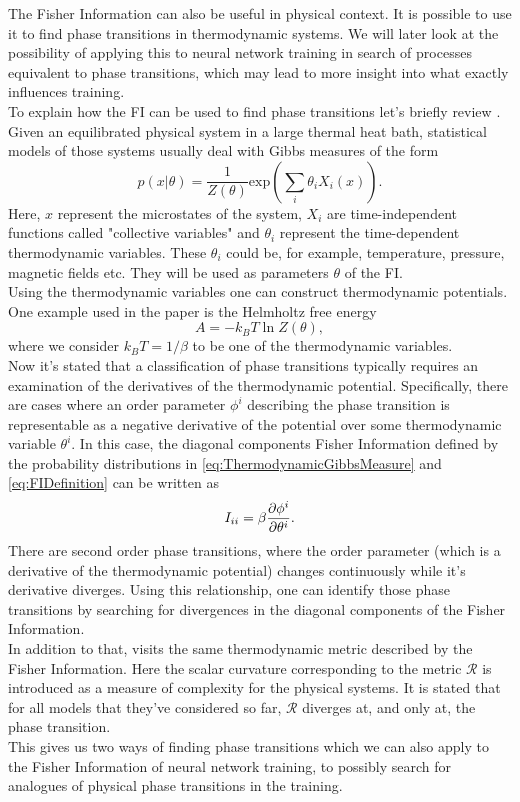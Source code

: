 The Fisher Information can also be useful in physical context. It is possible to use it to find phase transitions in thermodynamic systems. We will later look at the possibility of applying this to neural network training in search of processes equivalent to phase transitions, which may lead to more insight into what exactly influences training.\\
To explain how the FI can be used to find phase transitions let's briefly review \cite{Prokopenko}.\\
Given an equilibrated physical system in a large thermal heat bath, statistical models of those systems usually deal with Gibbs measures of the form 
\begin{equation}\label{eq:ThermodynamicGibbsMeasure}
	p(x|\theta) = \frac{1}{Z(\theta)} \mathrm{exp}\left(\sum_i \theta_i X_i(x)\right).
\end{equation}
Here, $x$ represent the microstates of the system, $X_i$ are time-independent functions called "collective variables" and $\theta_i$ represent the time-dependent thermodynamic variables. These $\theta_i$ could be, for example, temperature, pressure, magnetic fields etc. They will be used as parameters $\theta$ of the FI.\\
Using the thermodynamic variables one can construct thermodynamic potentials. One example used in the paper is the Helmholtz free energy 
\begin{equation}
	A = - k_B T \ln Z(\theta),
\end{equation}
where we consider $k_B T = 1/\beta$ to be one of the thermodynamic variables. \\
Now it's stated that a classification of phase transitions typically requires an examination of the derivatives of the thermodynamic potential. Specifically, there are cases where an order parameter $\phi^i$ describing the phase transition is representable as a negative derivative of the potential over some thermodynamic variable $\theta^i$. In this case, the diagonal components Fisher Information defined by the probability distributions in \cref{eq:ThermodynamicGibbsMeasure} and \cref{eq:FIDefinition} can be written as
\begin{equation}
	I_{ii} = \beta \frac{\partial\phi^i}{\partial\theta^i}.
\end{equation}
There are second order phase transitions, where the order parameter (which is a derivative of the thermodynamic potential) changes continuously while it's derivative diverges. Using this relationship, one can identify those phase transitions by searching for divergences in the diagonal components of the Fisher Information.\\
In addition to that, \cite{Janke} visits the same thermodynamic metric described by the Fisher Information. Here the scalar curvature corresponding to the metric $\mathscr{R}$ is introduced as a measure of complexity for the physical systems. It is stated that for all models that they've considered so far, $\mathscr{R}$ diverges at, and only at, the phase transition.\\
This gives us two ways of finding phase transitions which we can also apply to the Fisher Information of neural network training, to possibly search for analogues of physical phase transitions in the training.